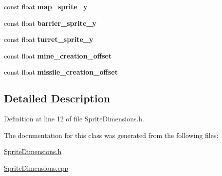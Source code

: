 \begin{DoxyCompactItemize}
\item 
\hypertarget{class_sprite_dimensions_a33014d94b303afe312e1a4b2fb5e437f}{const float {\bfseries map\+\_\+sprite\+\_\+y}}\label{class_sprite_dimensions_a33014d94b303afe312e1a4b2fb5e437f}

\item 
\hypertarget{class_sprite_dimensions_abad79766e2254e365d3455b3471a5d0a}{const float {\bfseries barrier\+\_\+sprite\+\_\+y}}\label{class_sprite_dimensions_abad79766e2254e365d3455b3471a5d0a}

\item 
\hypertarget{class_sprite_dimensions_a1b808c73bd915776ec6b8c10120adeae}{const float {\bfseries turret\+\_\+sprite\+\_\+y}}\label{class_sprite_dimensions_a1b808c73bd915776ec6b8c10120adeae}

\item 
\hypertarget{class_sprite_dimensions_a01c7c9dc1498f3336671b1ca697a7342}{const float {\bfseries mine\+\_\+creation\+\_\+offset}}\label{class_sprite_dimensions_a01c7c9dc1498f3336671b1ca697a7342}

\item 
\hypertarget{class_sprite_dimensions_a59055b28d0d2307c1e4f4b04ad93488e}{const float {\bfseries missile\+\_\+creation\+\_\+offset}}\label{class_sprite_dimensions_a59055b28d0d2307c1e4f4b04ad93488e}

\end{DoxyCompactItemize}


\subsection{Detailed Description}


Definition at line 12 of file Sprite\+Dimensions.\+h.



The documentation for this class was generated from the following files\+:\begin{DoxyCompactItemize}
\item 
\hyperlink{_sprite_dimensions_8h}{Sprite\+Dimensions.\+h}\item 
\hyperlink{_sprite_dimensions_8cpp}{Sprite\+Dimensions.\+cpp}\end{DoxyCompactItemize}
